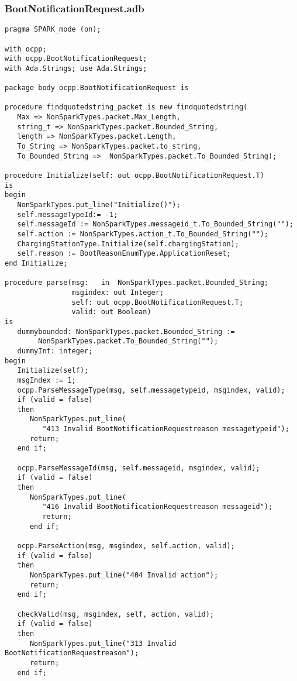 \documentclass[12pt,openany,a4paper]{book}
\begin{document}
\subsubsection{BootNotificationRequest.adb}
\begin{verbatim}
pragma SPARK_mode (on); 

with ocpp;
with ocpp.BootNotificationRequest;
with Ada.Strings; use Ada.Strings;

package body ocpp.BootNotificationRequest is 

procedure findquotedstring_packet is new findquotedstring(
   Max => NonSparkTypes.packet.Max_Length, 
   string_t => NonSparkTypes.packet.Bounded_String, 
   length => NonSparkTypes.packet.Length,
   To_String => NonSparkTypes.packet.to_string,
   To_Bounded_String =>  NonSparkTypes.packet.To_Bounded_String);

procedure Initialize(self: out ocpp.BootNotificationRequest.T)
is
begin
   NonSparkTypes.put_line("Initialize()");
   self.messageTypeId:= -1;
   self.messageId := NonSparkTypes.messageid_t.To_Bounded_String("");
   self.action := NonSparkTypes.action_t.To_Bounded_String("");
   ChargingStationType.Initialize(self.chargingStation);
   self.reason := BootReasonEnumType.ApplicationReset;
end Initialize;

procedure parse(msg:   in  NonSparkTypes.packet.Bounded_String;
                msgindex: out Integer;
                self: out ocpp.BootNotificationRequest.T;
                valid: out Boolean)
is
   dummybounded: NonSparkTypes.packet.Bounded_String := 
   		NonSparkTypes.packet.To_Bounded_String("");
   dummyInt: integer;
begin
   Initialize(self);
   msgIndex := 1;
   ocpp.ParseMessageType(msg, self.messagetypeid, msgindex, valid);
   if (valid = false) 
   then 
      NonSparkTypes.put_line(
         "413 Invalid BootNotificationRequestreason messagetypeid"); 
      return; 
   end if;

   ocpp.ParseMessageId(msg, self.messageid, msgindex, valid);
   if (valid = false) 
   then 
      NonSparkTypes.put_line(
         "416 Invalid BootNotificationRequestreason messageid"); 
         return; 
      end if;

   ocpp.ParseAction(msg, msgindex, self.action, valid);
   if (valid = false) 
   then 
      NonSparkTypes.put_line("404 Invalid action"); 
      return; 
   end if; 

   checkValid(msg, msgindex, self, action, valid);
   if (valid = false) 
   then 
      NonSparkTypes.put_line("313 Invalid BootNotificationRequestreason"); 
      return; 
   end if;


\end{verbatim}
\end{document}
